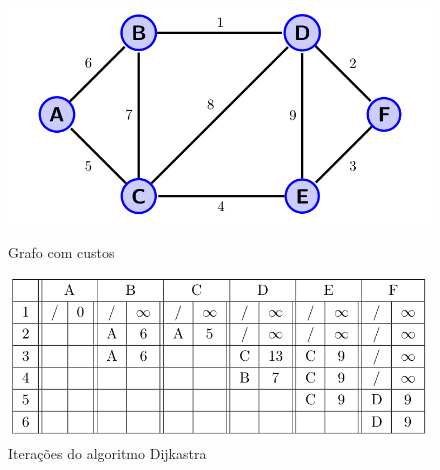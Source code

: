 \begin{figure}
  \begin{minipage}[c]{0.42\linewidth}
	\includegraphics[width=\linewidth]{./images/dijkastra_01.png}
	\caption{Grafo com custos}
	\label{fig:dijkastra_graph}
  \end{minipage}
  \hfill
  \begin{minipage}[c]{0.57\linewidth}
	\includegraphics[width=\linewidth]{./images/dijkastra_02.png}
	\caption{Iterações do algoritmo Dijkastra}
	\label{fig:dijkastra_table}
  \end{minipage}
\end{figure}

